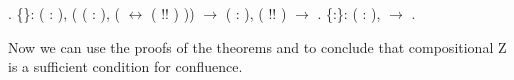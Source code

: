 \begin{coqdoccode}
\coqdocnoindent
{}  .\coqdoceol
\coqdocnoindent
{}  \{\}: \coqdockw{\ensuremath{\forall}} (   :  ), (\coqdockw{\ensuremath{\forall}} (  : ), (   \ensuremath{\leftrightarrow} ( !\coqdocvar{\_}! )  )) \ensuremath{\rightarrow} \coqdockw{\ensuremath{\forall}} ( : ),  ( !\coqdocvar{\_}! )   \ensuremath{\rightarrow}    .\coqdoceol
\coqdocemptyline
\coqdocnoindent
{}  \{:\}: \coqdockw{\ensuremath{\forall}} ( : ),   \ensuremath{\rightarrow}  .\coqdoceol
\coqdocemptyline
\end{coqdoccode}
Now we can use the proofs of the theorems 
and  to conclude that compositional Z is a
sufficient condition for confluence. 
